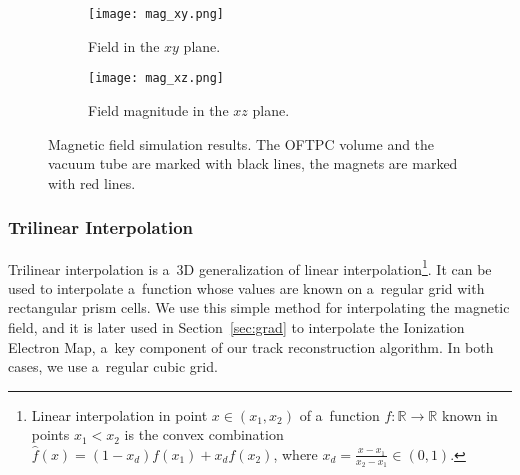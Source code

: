 			\begin{figure}
				\centering
				\begin{subfigure}[t]{0.45\textwidth}
					\centering
					\texttt{[image: mag\_xy.png]}
					\caption{Field in the $xy$ plane.}
				\end{subfigure}
				\hfill
				\begin{subfigure}[t]{0.45\textwidth}
					\centering
					\texttt{[image: mag\_xz.png]}
					\caption{Field magnitude in the $xz$ plane.}
				\end{subfigure}
				\caption{Magnetic field simulation results. The \ac{OFTPC} volume and the vacuum tube are marked with black lines, the magnets are marked with red lines.}
				\label{fig:mag}
			\end{figure}
		
			\subsubsection{Trilinear Interpolation}
			\label{sec:trilin}
				Trilinear interpolation is a~3D generalization of linear interpolation\footnote{Linear interpolation in point $x\in(x_1,x_2)$ of a~function $f\colon\mathbb{R}\to\mathbb{R}$ known in points $x_1 < x_2$ is the convex combination $\widehat{f}(x) = (1-x_d)f(x_1)+x_d f(x_2)$, where $x_d = \frac{x-x_1}{x_2-x_1} \in (0,1)$.}. It can be used to interpolate a~function whose values are known on a~regular grid with rectangular prism cells. We use this simple method for interpolating the magnetic field, and it is later used in Section~\ref{sec:grad} to interpolate the Ionization Electron Map, a~key component of our track reconstruction algorithm. In both cases, we use a~regular cubic grid.
				
